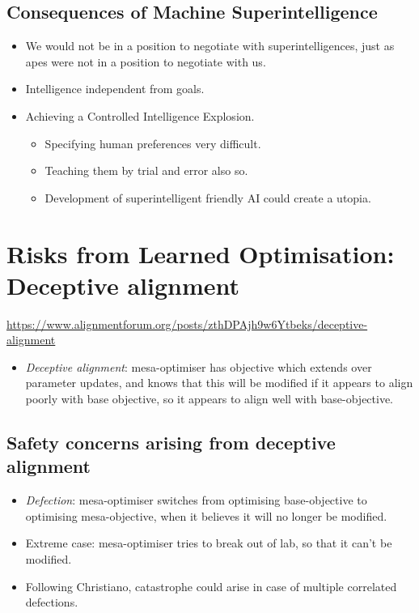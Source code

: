 \subsection{Consequences of Machine Superintelligence}

\begin{itemize}
    \item We would not be in a position to negotiate with superintelligences, just as apes were not in a position to negotiate with us.
    \item Intelligence independent from goals.
    \item Achieving a Controlled Intelligence Explosion.
    \begin{itemize}
        \item Specifying human preferences very difficult.
        \item Teaching them by trial and error also so.
        \item Development of superintelligent friendly AI could create a utopia.
    \end{itemize}
\end{itemize}


\section{Risks from Learned Optimisation: Deceptive alignment}

\url{https://www.alignmentforum.org/posts/zthDPAjh9w6Ytbeks/deceptive-alignment}

\begin{itemize}
    \item \emph{Deceptive alignment}: mesa-optimiser has objective which extends over parameter updates, and knows that this will be modified if it appears to align poorly with base objective, so it appears to align well with base-objective.
\end{itemize}


\subsection{Safety concerns arising from deceptive alignment}

\begin{itemize}
    \item \emph{Defection}: mesa-optimiser switches from optimising base-objective to optimising mesa-objective, when it believes it will no longer be modified.
    \item Extreme case: mesa-optimiser tries to break out of lab, so that it can't be modified.
    \item Following Christiano, catastrophe could arise in case of multiple correlated defections.
\end{itemize}


